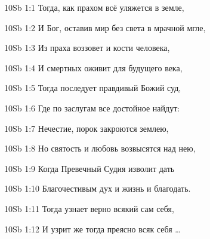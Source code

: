 \vs 10Sb 1:1 Тогда, как прахом всё уляжется в земле,

\vs 10Sb 1:2 И Бог, оставив мир без света в мрачной мгле,

\vs 10Sb 1:3 Из праха воззовет и кости человека,

\vs 10Sb 1:4 И смертных оживит для будущего века,

\vs 10Sb 1:5 Тогда последует правдивый Божий суд,

\vs 10Sb 1:6 Где по заслугам все достойное найдут:

\vs 10Sb 1:7 Нечестие, порок закроются землею,

\vs 10Sb 1:8 Но святость и любовь возвысятся над нею,

\vs 10Sb 1:9 Когда Превечный Судия изволит дать

\vs 10Sb 1:10 Благочестивым дух и жизнь и благодать.

\vs 10Sb 1:11 Тогда узнает верно всякий сам себя,

\vs 10Sb 1:12 И узрит же тогда преясно всяк себя \ldots
